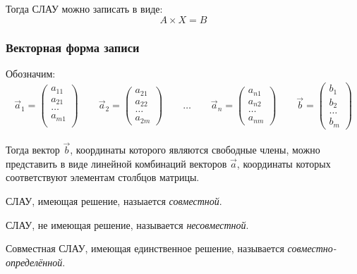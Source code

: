 Тогда СЛАУ можно записать в виде: \[
  \boxed{A \times X = B}
\] 

\subsubsection*{Векторная форма записи}

Обозначим:
\begin{gather*}
  \vec{a}_1 = \left( 
    \begin{matrix}
      a_{11} \\
      a_{21} \\
      \ldots \\
      a_{m1} \\
    \end{matrix}
  \right) \qquad
  \vec{a}_2 = \left( 
    \begin{matrix}
      a_{21} \\
      a_{22} \\
      \ldots \\
      a_{2m}
    \end{matrix}
  \right) \qquad \ldots \qquad 
  \vec{a}_n = \left( 
    \begin{matrix}
      a_{n1} \\
      a_{n2} \\
      \ldots \\
      a_{nm}
    \end{matrix}
  \right) \qquad 
  \vec{b} = \left( 
    \begin{matrix}
      b_1 \\ 
      b_2 \\
      \ldots \\
      b_m
    \end{matrix}
  \right)
\end{gather*}

Тогда вектор $\vec{b}$, координаты которого являются свободные члены, можно представить в виде линейной комбинаций векторов $\vec{a}$, координаты которых соответствуют элементам столбцов матрицы.

\begin{definition}
  СЛАУ, имеющая решение, назыается \textit{совместной}.
\end{definition}

\begin{definition}
  СЛАУ, не имеющая решение, называется \textit{несовместной}.  
\end{definition}

\begin{definition}
  Совместная СЛАУ, имеющая единственное решение, называется \textit{совместно-определённой}. 
\end{definition}


